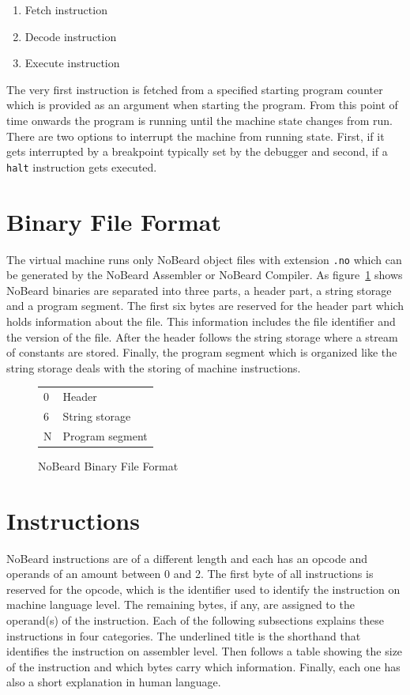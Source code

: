 \begin{enumerate}
\item Fetch instruction
\item Decode instruction
\item Execute instruction
\end{enumerate}

The very first instruction is fetched from a specified starting program counter which is provided as an argument when starting the program. From this point of time onwards the program is running until the machine state changes from run. There are two options to interrupt the machine from running state. First, if it gets interrupted by a breakpoint typically set by the debugger and second, if a \lstinline$halt$ instruction gets executed.

\section{Binary File Format}
The virtual machine runs only NoBeard object files with extension \lstinline$.no$ which can be generated by the NoBeard Assembler or NoBeard Compiler. As figure~\ref{fig:binaryfileformat} shows NoBeard binaries are separated into three parts, a header part, a string storage and a program segment.
The first six bytes are reserved for the header part which holds information about the file. This information includes the file identifier and the version of the file. After the header follows the string storage where a stream of constants are stored. Finally, the program segment which is organized like the string storage deals with the storing of machine instructions. 
\begin{figure}[h]
\begin{center}
\begin{tabular}{p{1em}|p{10em}|}
\cline{2-2}
\parbox[c][3em][t]{1em}{\hfill 0} & Header \\ 
\parbox[c][4em][t]{1em}{\hfill 6} & String storage \\ 
\parbox[c][5em][b]{1em}{\hfill N} & Program segment \\ 
\end{tabular}
\end{center}
\caption{NoBeard Binary File Format}\label{fig:binaryfileformat}
\end{figure}

\section{Instructions}\label{sec:instructions}
NoBeard instructions are of a different length and each has an opcode and operands of an amount between 0 and 2. The first byte of all instructions is reserved for the opcode, which is the identifier used to identify the instruction on machine language level. The remaining bytes, if any, are assigned to the operand(s) of the instruction.
Each of the following subsections explains these instructions in four categories. The underlined title is the shorthand that identifies the instruction on assembler level. Then follows a table showing the size of the instruction and which bytes carry which information. Finally, each one has also a short explanation in human language.

